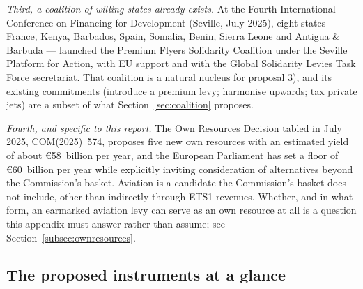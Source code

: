 \documentclass[11pt]{article}
\begin{document}
\emph{Third, a coalition of willing states already exists.} At the Fourth
International Conference on Financing for Development (Seville, July 2025),
eight states --- France, Kenya, Barbados, Spain, Somalia, Benin, Sierra Leone
and Antigua \& Barbuda --- launched the Premium Flyers Solidarity Coalition
under the Seville Platform for Action, with EU support and with the Global
Solidarity Levies Task Force secretariat. That coalition is a natural nucleus
for proposal 3), and its existing commitments (introduce a premium levy;
harmonise upwards; tax private jets) are a subset of what
Section~\ref{sec:coalition} proposes.

\emph{Fourth, and specific to this report.} The Own Resources Decision tabled in
July 2025, COM(2025)~574, proposes five new own resources with an estimated
yield of about €58~billion per year, and the European Parliament has set a floor
of €60~billion per year while explicitly inviting consideration of alternatives
beyond the Commission's basket. Aviation is a candidate the Commission's basket
does not include, other than indirectly through ETS1 revenues. Whether, and in
what form, an earmarked aviation levy can serve as an own resource at all is a
question this appendix must answer rather than assume; see
Section~\ref{subsec:ownresources}.

\subsection{The proposed instruments at a glance}
\end{document}
